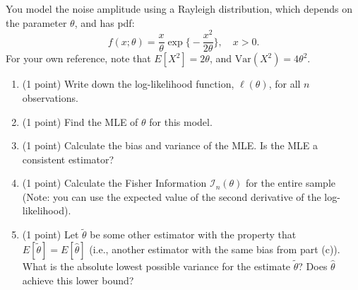 \documentclass[10pt,twoside]{article}\usepackage[]{graphicx}\usepackage[dvipsnames,svgnames,table]{xcolor}
\newcommand{\Var}{\text{Var}}
\begin{document}
\begin{enumerate}
  You model the noise amplitude using a Rayleigh distribution, which depends on the parameter $\theta$, and has pdf:
  $$
  f(x; \theta) = \frac{x}{\theta} \exp\Big\{-\frac{x^2}{2\theta}\Big\}, \quad x > 0.
  $$
  For your own reference, note that $E[X^2] = 2\theta$, and $\Var(X^2) = 4\theta^2$.
  \begin{enumerate}
    \item (1 point) Write down the log-likelihood function, $\ell(\theta)$, for all $n$ observations.
    \item (1 point) Find the MLE of $\theta$ for this model.
    \item (1 point) Calculate the bias and variance of the MLE. Is the MLE a consistent estimator?
    \item (1 point) Calculate the Fisher Information $\mathcal{I}_n(\theta)$ for the entire sample (Note: you can use the expected value of the second derivative of the log-likelihood).
    \item (1 point) Let $\tilde{\theta}$ be some other estimator with the property that $E[\tilde{\theta}] = E[\hat{\theta}]$ (i.e., another estimator with the same bias from part (c)). What is the absolute lowest possible variance for the estimate $\tilde{\theta}$? Does $\hat{\theta}$ achieve this lower bound?
  \end{enumerate}
\end{enumerate}
\end{document}

